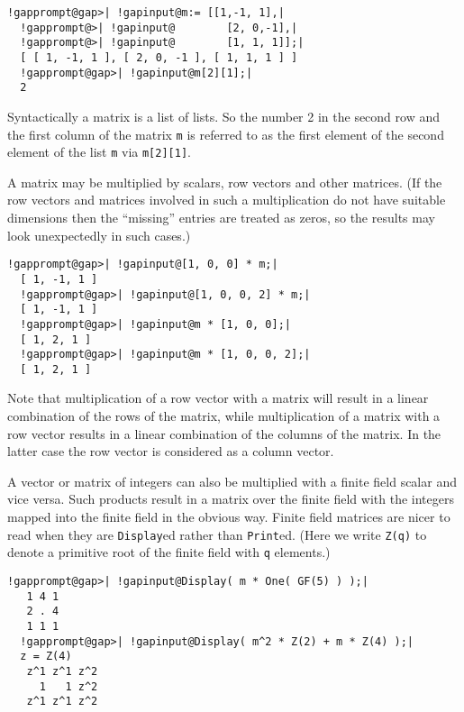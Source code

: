 \documentclass[a4paper,11pt]{report}
\begin{document}
{{ 
\begin{Verbatim}[commandchars=!@|,fontsize=\small,frame=single,label=Example]
  !gapprompt@gap>| !gapinput@m:= [[1,-1, 1],|
  !gapprompt@>| !gapinput@        [2, 0,-1],|
  !gapprompt@>| !gapinput@        [1, 1, 1]];|
  [ [ 1, -1, 1 ], [ 2, 0, -1 ], [ 1, 1, 1 ] ]
  !gapprompt@gap>| !gapinput@m[2][1];|
  2
\end{Verbatim}
 

 Syntactically a matrix is a list of lists. So the number 2 in the second row
and the first column of the matrix \texttt{m} is referred to as the first element of the second element of the list \texttt{m} via \texttt{m[2][1]}. 

 A matrix may be multiplied by scalars, row vectors and other matrices. (If the
row vectors and matrices involved in such a multiplication do not have
suitable dimensions then the ``missing'' entries are treated as zeros, so the results may look unexpectedly in such
cases.) 

 
\begin{Verbatim}[commandchars=!@|,fontsize=\small,frame=single,label=Example]
  !gapprompt@gap>| !gapinput@[1, 0, 0] * m;|
  [ 1, -1, 1 ]
  !gapprompt@gap>| !gapinput@[1, 0, 0, 2] * m;|
  [ 1, -1, 1 ]
  !gapprompt@gap>| !gapinput@m * [1, 0, 0];|
  [ 1, 2, 1 ]
  !gapprompt@gap>| !gapinput@m * [1, 0, 0, 2];|
  [ 1, 2, 1 ]
\end{Verbatim}
 

 Note that multiplication of a row vector with a matrix will result in a linear
combination of the rows of the matrix, while multiplication of a matrix with a
row vector results in a linear combination of the columns of the matrix. In
the latter case the row vector is considered as a column vector. 

 A vector or matrix of integers can also be multiplied with a finite field
scalar and vice versa. Such products result in a matrix over the finite field
with the integers mapped into the finite field in the obvious way. Finite
field matrices are nicer to read when they are \texttt{Display}ed rather than \texttt{Print}ed. (Here we write \texttt{Z(q)} to denote a primitive root of the finite field with \texttt{q} elements.) 

 
\begin{Verbatim}[commandchars=!@|,fontsize=\small,frame=single,label=Example]
  !gapprompt@gap>| !gapinput@Display( m * One( GF(5) ) );|
   1 4 1
   2 . 4
   1 1 1
  !gapprompt@gap>| !gapinput@Display( m^2 * Z(2) + m * Z(4) );|
  z = Z(4)
   z^1 z^1 z^2
     1   1 z^2
   z^1 z^1 z^2
\end{Verbatim}
 

}}
\end{document}
